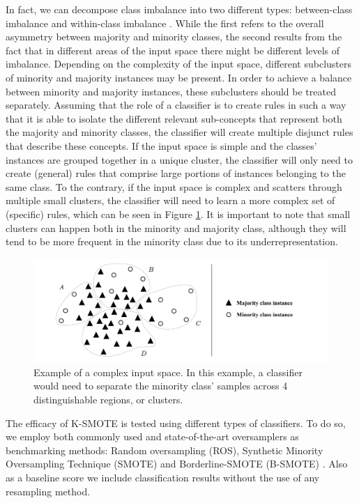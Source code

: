 \documentclass[parskip=full]{scrartcl}
\begin{document}
In fact, we can decompose class imbalance into two different types:
between-class imbalance and within-class imbalance \cite{Douzas2018, Jo2004}. While
the first refers to the overall asymmetry between majority and minority
classes, the second results from the fact that in different areas of the input
space there might be different levels of imbalance. Depending on the
complexity of the input space, different subclusters of minority and majority
instances may be present. In order to achieve a balance between minority and
majority instances, these subclusters should be treated separately. Assuming
that the role of a classifier is to create rules in such a way that it is able
to isolate the different relevant sub-concepts that represent both the
majority and minority classes, the classifier will create multiple disjunct
rules that describe these concepts. If the input space is simple and the
classes’ instances are grouped together in a unique cluster, the classifier
will only need to create (general) rules that comprise large portions of
instances belonging to the same class. To the contrary, if the input space is
complex and scatters through multiple small clusters, the classifier will need
to learn a more complex set of (specific) rules, which can be seen in Figure
\ref{fig:complex_input_space_example}. It is important to note that small
clusters can happen both in the minority and majority class, although they
will tend to be more frequent in the minority class due to its
underrepresentation.  

\begin{figure}[H]
	\centering
	\includegraphics[width=1\linewidth]{../analysis/complex_input_space_example}
	\caption{Example of a complex input space. In this example, a classifier
        would need to separate the minority class' samples across 4
        distinguishable regions, or clusters. }
	\label{fig:complex_input_space_example}
\end{figure}

The efficacy of K-SMOTE is tested using
different types of classifiers. To do so, we employ both commonly used and
state-of-the-art oversamplers as benchmarking methods: Random oversampling
(ROS), Synthetic Minority Oversampling Technique (SMOTE) \cite{Chawla2002} and
Borderline-SMOTE (B-SMOTE) \cite{Han2005}. Also as a baseline score we include
classification results without the use of any resampling method.
\end{document}
